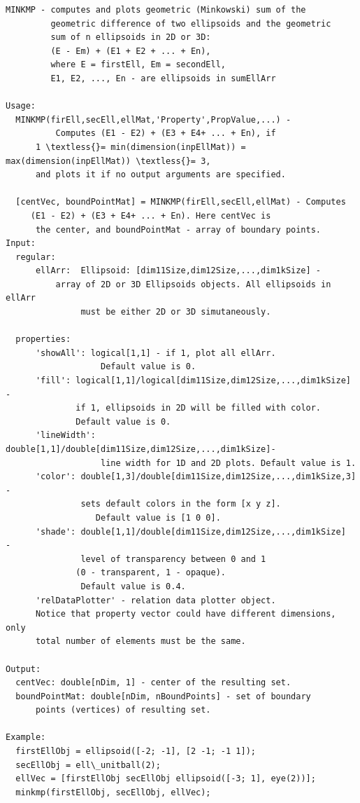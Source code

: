 \documentclass[letterpaper,10pt,english]{sphinxmanual}
\begin{document}
\begin{Verbatim}[commandchars=\\\{\}]
MINKMP - computes and plots geometric (Minkowski) sum of the
         geometric difference of two ellipsoids and the geometric
         sum of n ellipsoids in 2D or 3D:
         (E - Em) + (E1 + E2 + ... + En),
         where E = firstEll, Em = secondEll,
         E1, E2, ..., En - are ellipsoids in sumEllArr

Usage:
  MINKMP(firEll,secEll,ellMat,'Property',PropValue,...) -
          Computes (E1 - E2) + (E3 + E4+ ... + En), if
      1 \textless{}= min(dimension(inpEllMat)) = max(dimension(inpEllMat)) \textless{}= 3,
      and plots it if no output arguments are specified.

  [centVec, boundPointMat] = MINKMP(firEll,secEll,ellMat) - Computes
     (E1 - E2) + (E3 + E4+ ... + En). Here centVec is
      the center, and boundPointMat - array of boundary points.
Input:
  regular:
      ellArr:  Ellipsoid: [dim11Size,dim12Size,...,dim1kSize] -
          array of 2D or 3D Ellipsoids objects. All ellipsoids in ellArr
               must be either 2D or 3D simutaneously.

  properties:
      'showAll': logical[1,1] - if 1, plot all ellArr.
                   Default value is 0.
      'fill': logical[1,1]/logical[dim11Size,dim12Size,...,dim1kSize]  -
              if 1, ellipsoids in 2D will be filled with color.
              Default value is 0.
      'lineWidth': double[1,1]/double[dim11Size,dim12Size,...,dim1kSize]-
                   line width for 1D and 2D plots. Default value is 1.
      'color': double[1,3]/double[dim11Size,dim12Size,...,dim1kSize,3] -
               sets default colors in the form [x y z].
                  Default value is [1 0 0].
      'shade': double[1,1]/double[dim11Size,dim12Size,...,dim1kSize]  -
               level of transparency between 0 and 1
              (0 - transparent, 1 - opaque).
               Default value is 0.4.
      'relDataPlotter' - relation data plotter object.
      Notice that property vector could have different dimensions, only
      total number of elements must be the same.

Output:
  centVec: double[nDim, 1] - center of the resulting set.
  boundPointMat: double[nDim, nBoundPoints] - set of boundary
      points (vertices) of resulting set.

Example:
  firstEllObj = ellipsoid([-2; -1], [2 -1; -1 1]);
  secEllObj = ell\_unitball(2);
  ellVec = [firstEllObj secEllObj ellipsoid([-3; 1], eye(2))];
  minkmp(firstEllObj, secEllObj, ellVec);
\end{Verbatim}
\end{document}

